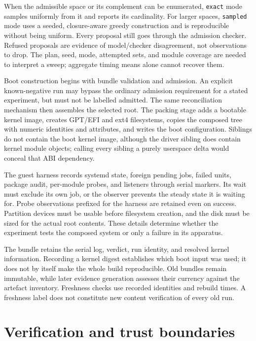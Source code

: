 When the admissible space or its complement can be enumerated, \texttt{exact} mode samples uniformly from it and reports its cardinality. For larger spaces, \texttt{sampled} mode uses a seeded, closure-aware greedy construction and is reproducible without being uniform. Every proposal still goes through the admission checker. Refused proposals are evidence of model/checker disagreement, not observations to drop. The plan, seed, mode, attempted sets, and module coverage are needed to interpret a sweep; aggregate timing means alone cannot recover them.

Boot construction begins with bundle validation and admission. An explicit known-negative run may bypass the ordinary admission requirement for a stated experiment, but must not be labelled admitted. The same reconciliation mechanism then assembles the selected root. The packing stage adds a bootable kernel image, creates \ac{GPT}/\ac{EFI} and ext4 filesystems, copies the composed tree with numeric identities and attributes, and writes the boot configuration. Siblings do not contain the boot kernel image, although the driver sibling does contain kernel module objects; calling every sibling a purely userspace delta would conceal that \ac{ABI} dependency.

The guest harness records systemd state, foreign pending jobs, failed units, package audit, per-module probes, and listeners through serial markers. Its wait must exclude its own job, or the observer prevents the steady state it is waiting for. Probe observations prefixed for the harness are retained even on success. Partition devices must be usable before filesystem creation, and the disk must be sized for the actual root contents. These details determine whether the experiment tests the composed system or only a failure in its apparatus.

The bundle retains the serial log, verdict, run identity, and resolved kernel information. Recording a kernel digest establishes which boot input was used; it does not by itself make the whole build reproducible. Old bundles remain immutable, while later evidence generation assesses their currency against the artefact inventory. Freshness checks use recorded identities and rebuild times. A freshness label does not constitute new content verification of every old run.

\section{Verification and trust boundaries}
\label{sec:arch:trust}

